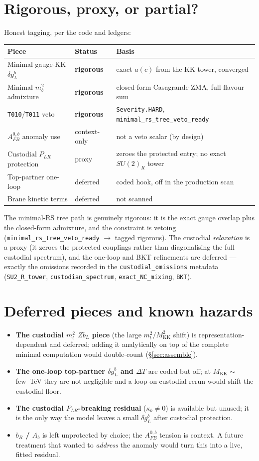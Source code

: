 \documentclass[11pt]{article}
\newcommand{\MKK}{M_{\mathrm{KK}}}
\newcommand{\SUR}{SU(2)_R}
\newcommand{\PLR}{P_{LR}}
\newcommand{\code}[1]{\texttt{#1}}
\newcommand{\dgL}{\delta g_L^b}
\newcommand{\Afb}{A_{FB}^{0,b}}
\theoremstyle{definition}
\begin{document}
\section{Rigorous, proxy, or partial?}
\label{sec:tags}
Honest tagging, per the code and ledgers:
\begin{center}
\begin{tabular}{lll}
\toprule
Piece & Status & Basis \\
\midrule
Minimal gauge-KK $\dgL$ & \textbf{rigorous} & exact $a(c)$ from the KK tower, converged \\
Minimal $m_b^2$ admixture & \textbf{rigorous} & closed-form Casagrande ZMA, full flavour sum \\
\code{T010}/\code{T011} veto & \textbf{rigorous} & \code{Severity.HARD}, \code{minimal\_rs\_tree\_veto\_ready} \\
$\Afb$ anomaly use & context-only & not a veto scalar (by design) \\
Custodial $\PLR$ protection & proxy & zeroes the protected entry; no exact $\SUR$ tower \\
Top-partner one-loop & deferred & coded hook, off in the production scan \\
Brane kinetic terms & deferred & not scanned \\
\bottomrule
\end{tabular}
\end{center}
The minimal-RS tree path is genuinely rigorous: it is the exact gauge overlap
plus the closed-form admixture, and the constraint is vetoing
(\code{minimal\_rs\_tree\_veto\_ready} $\to$ tagged rigorous). The custodial
\emph{relaxation} is a proxy (it zeroes the protected couplings rather than
diagonalising the full custodial spectrum), and the one-loop and BKT refinements
are deferred --- exactly the omissions recorded in the
\code{custodial\_omissions} metadata (\code{SU2\_R\_tower},
\code{custodian\_spectrum}, \code{exact\_NC\_mixing}, \code{BKT}).

\section{Deferred pieces and known hazards}
\label{sec:deferred}
\begin{itemize}[leftmargin=1.4em]
\item \textbf{The custodial $m_t^2$ $Zb_L$ piece} (the large
$m_t^2/\MKK^2$ shift) is representation-dependent and deferred; adding it
analytically on top of the complete minimal computation would double-count
(\S\ref{sec:assemble}).
\item \textbf{The one-loop top-partner $\dgL$ and $\Delta T$} are coded but off;
at $\MKK\sim$ few~TeV they are not negligible and a loop-on custodial rerun would
shift the custodial floor.
\item \textbf{The custodial $\PLR$-breaking residual} ($\kappa_b\neq 0$) is
available but unused; it is the only way the model leaves a small $\dgL$ after
custodial protection.
\item \textbf{$b_R$ / $A_b$} is left unprotected by choice; the $\Afb$ tension is
context. A future treatment that wanted to \emph{address} the anomaly would turn
this into a live, fitted residual.
\end{itemize}
\end{document}
